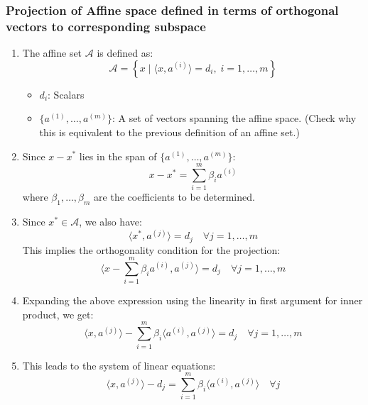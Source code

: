         \subsubsection{Projection of Affine space defined in terms of orthogonal vectors to corresponding subspace}
        \begin{derivation}
            \begin{enumerate}
                \item The affine set $\mathcal{A}$ is defined as:
                \[
                \mathcal{A} = \left\{ x \mid \langle x, a^{(i)} \rangle = d_i, \; i = 1, \dots, m \right\}
                \]
                \begin{itemize}
                    \item $d_i$: Scalars
                    \item $\{a^{(1)}, \dots, a^{(m)}\}$: A set of vectors spanning the affine space. (Check why this is equivalent to the previous definition of an affine set.)
                \end{itemize}
                
                \item Since $x-x^*$ lies in the span of $\{a^{(1)}, \dots, a^{(m)}\}$:
                \[
                x - x^* = \sum_{i=1}^{m} \beta_i a^{(i)}
                \]
                where $\beta_1, \dots, \beta_m$ are the coefficients to be determined.
                
                \item Since $x^* \in \mathcal{A}$, we also have:
                \[
                \langle x^*, a^{(j)} \rangle = d_j \quad \forall j = 1, \dots, m
                \]
                This implies the orthogonality condition for the projection:
                \[
                \langle x - \sum_{i=1}^{m} \beta_i a^{(i)}, a^{(j)} \rangle = d_j \quad \forall j = 1, \dots, m
                \]
            
                \item Expanding the above expression using the linearity in first argument for inner product, we get:
                \[
                \langle x, a^{(j)} \rangle - \sum_{i=1}^{m} \beta_i \langle a^{(i)}, a^{(j)} \rangle = d_j \quad \forall j = 1, \dots, m
                \]
                
                \item This leads to the system of linear equations:
                \[
                \langle x, a^{(j)} \rangle - d_j = \sum_{i=1}^{m} \beta_i \langle a^{(i)}, a^{(j)} \rangle \quad \forall j
                \]
                

\end{enumerate}
\end{derivation}

